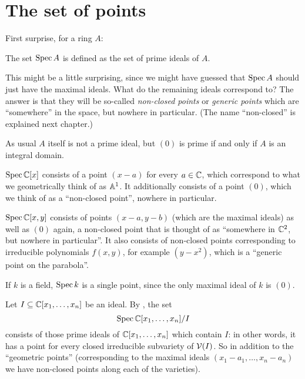 \section{The set of points}

First surprise, for a ring $A$:
\begin{definition}
	The set $\operatorname{Spec} A$ is defined as the set of prime ideals of $A$.
\end{definition}

This might be a little surprising, since we might have guessed
that $\operatorname{Spec} A$ should just have the maximal ideals.
What do the remaining ideals correspond to?
The answer is that they will be so-called \emph{non-closed points}
or \emph{generic points} which are ``somewhere'' in the space,
but nowhere in particular.
(The name ``non-closed'' is explained next chapter.)

\begin{remark}
	As usual $A$ itself is not a prime ideal, but $(0)$
	is prime if and only if $A$ is an integral domain.
\end{remark}

\begin{example}
	\listhack
	\begin{enumerate}[(a)]
		\ii $\operatorname{Spec} \mathbb C[x]$ consists of a point $(x-a)$ for every $a \in \mathbb C$,
		which correspond to what we geometrically think of as $\mathbb A^1$.
		It additionally consists of a point $(0)$,
		which we think of as a ``non-closed point'', nowhere in particular.

		\ii $\operatorname{Spec} \mathbb C[x,y]$ consists of points $(x-a,y-b)$
		(which are the maximal ideals) as well as $(0)$ again,
		a non-closed point that is thought of as ``somewhere in $\mathbb C^2$,
		but nowhere in particular''.
		It also consists of non-closed points corresponding to irreducible
		polynomials $f(x,y)$, for example $(y-x^2)$,
		which is a ``generic point on the parabola''.

		\ii If $k$ is a field, $\operatorname{Spec} k$ is a single point,
		since the only maximal ideal of $k$ is $(0)$.
	\end{enumerate}
\end{example}

\begin{example}
	Let $I \subseteq \mathbb C[x_1, \dots, x_n]$ be an ideal.
	By ,
	the set \[ \operatorname{Spec} \mathbb C[x_1, \dots, x_n] /I \]
	consists of those prime ideals of $\mathbb C[x_1, \dots, x_n]$
	which contain $I$: in other words, it has a
	point for every closed irreducible subvariety of $\mathcal V(I)$.
	So in addition to the ``geometric points''
	(corresponding to the maximal ideals $(x_1-a_1, \dots, x_n-a_n)$
	we have non-closed points along each of the varieties).
\end{example}


